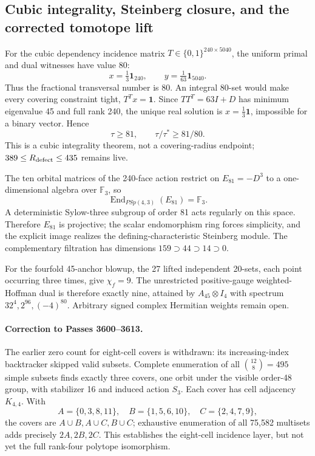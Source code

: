 \subsection{Cubic integrality, Steinberg closure, and the corrected tomotope lift}
\label{sec:bt3649-3662-seven-front-closure}

For the cubic dependency incidence matrix \(T\in\{0,1\}^{240\times5040}\), the uniform primal and dual witnesses have value 80:
\[
x=\tfrac13\mathbf1_{240},\qquad y=\tfrac1{63}\mathbf1_{5040}.
\]
Thus the fractional transversal number is 80.  An integral 80-set would make every covering constraint tight, \(T^Tx=\mathbf1\).  Since \(TT^T=63I+D\) has minimum eigenvalue 45 and full rank 240, the unique real solution is \(x=\tfrac13\mathbf1\), impossible for a binary vector.  Hence
\[
\boxed{\tau\ge81},\qquad \tau/\tau^*\ge81/80.
\]
This is a cubic integrality theorem, not a covering-radius endpoint; \(389\le R_{\rm defect}\le435\) remains live.

The ten orbital matrices of the 240-face action restrict on \(E_{81}=-D^3\) to a one-dimensional algebra over \(\mathbb F_3\), so
\[
\operatorname{End}_{PSp(4,3)}(E_{81})=\mathbb F_3.
\]
A deterministic Sylow-three subgroup of order 81 acts regularly on this space. Therefore \(E_{81}\) is projective; the scalar endomorphism ring forces simplicity, and the explicit image realizes the defining-characteristic Steinberg module. The complementary filtration has dimensions \(159\supset44\supset14\supset0\).

For the fourfold 45-anchor blowup, the 27 lifted independent 20-sets, each point occurring three times, give \(\chi_f=9\). The unrestricted positive-gauge weighted-Hoffman dual is therefore exactly nine, attained by \(A_{45}\otimes I_4\) with spectrum \(32^4,2^{96},(-4)^{80}\). Arbitrary signed complex Hermitian weights remain open.

\paragraph{Correction to Passes 3600--3613.}
The earlier zero count for eight-cell covers is withdrawn: its increasing-index backtracker skipped valid subsets. Complete enumeration of all \(\binom{12}{8}=495\) simple subsets finds exactly three covers, one orbit under the visible order-48 group, with stabilizer 16 and induced action \(S_3\). Each cover has cell adjacency \(K_{4,4}\). With
\[
A=\{0,3,8,11\},\quad B=\{1,5,6,10\},\quad C=\{2,4,7,9\},
\]
the covers are \(A\cup B,A\cup C,B\cup C\); exhaustive enumeration of all 75,582 multisets adds precisely \(2A,2B,2C\). This establishes the eight-cell incidence layer, but not yet the full rank-four polytope isomorphism.

